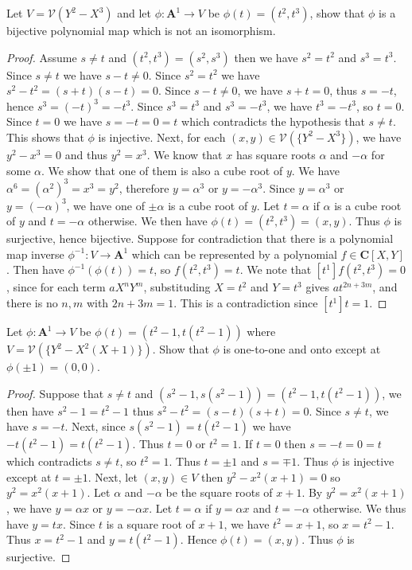 \documentclass[11pt]{book}
\begin{document}
\begin{problem}
Let $V=\mathcal{V}(Y^2-X^3)$ and let $\phi:\mathbf{A}^1\rightarrow V$ be $\phi(t)=(t^2,t^3)$, show that $\phi$ is a bijective polynomial map which is not an isomorphism.
\begin{proof}
Assume $s\ne t$ and $(t^2,t^3)=(s^2,s^3)$ then we have $s^2=t^2$ and $s^3=t^3$. Since $s\ne t$ we have $s-t\ne 0$. Since $s^2=t^2$ we have $s^2-t^2=(s+t)(s-t)=0$. Since $s-t\ne 0$, we have $s+t=0$, thus $s=-t$, hence $s^3=(-t)^3=-t^3$. Since $s^3=t^3$ and $s^3=-t^3$, we have $t^3=-t^3$, so $t=0$. Since $t=0$ we have $s=-t=0=t$ which contradicts the hypothesis that $s\ne t$. This shows that $\phi$ is injective. 
Next, for each $(x,y)\in\mathcal{V}(\{Y^2-X^3\})$, we have $y^2-x^3=0$ and thus $y^2=x^3$. We know that $x$ has square roots $\alpha$ and $-\alpha$ for some $\alpha$. We show that one of them is also a cube root of $y$. We have $\alpha^6=(\alpha^2)^3=x^3=y^2$, therefore $y=\alpha^3$ or $y=-\alpha^3$. Since $y=\alpha^3$ or $y=(-\alpha)^3$, we have one of $\pm\alpha$ is a cube root of $y$. Let $t=\alpha$ if $\alpha$ is a cube root of $y$ and $t=-\alpha$ otherwise. We then have $\phi(t)=(t^2,t^3)=(x,y)$. Thus $\phi$ is surjective, hence bijective. Suppose for contradiction that there is a polynomial map inverse $\phi^{-1}:V\rightarrow\mathbf A^1$ which can be represented by a polynomial $f\in\mathbf C[X,Y]$. Then have $\phi^{-1}(\phi(t))=t$, so $f(t^2,t^3)=t$. We note that $[t^1]f(t^2,t^3)=0$, since for each term $aX^nY^m$, substituding $X=t^2$ and $Y=t^3$ gives $at^{2n+3m}$, and there is no $n,m$ with $2n+3m=1$. This is a contradiction since $[t^1]t=1$.
\end{proof}
\end{problem}
\begin{problem}
Let $\phi:\mathbf A^1\rightarrow V$ be $\phi(t)=(t^2-1,t(t^2-1))$ where $V=\mathcal{V}(\{Y^2-X^2(X+1)\})$. Show that $\phi$ is one-to-one and onto except at $\phi(\pm 1)=(0,0)$.
\begin{proof}Suppose that $s\ne t$ and $(s^2-1,s(s^2-1))=(t^2-1,t(t^2-1))$, we then have $s^2-1=t^2-1$ thus $s^2-t^2=(s-t)(s+t)=0$. Since $s\ne t$, we have $s=-t$. Next, since $s(s^2-1)=t(t^2-1)$ we have $-t(t^2-1)=t(t^2-1)$. Thus $t=0$ or $t^2=1$. If $t=0$ then $s=-t=0=t$ which contradicts $s\ne t$, so $t^2=1$. Thus $t=\pm 1$ and $s=\mp 1$. Thus $\phi$ is injective except at $t=\pm 1$. Next, let $(x,y)\in V$ then $y^2-x^2(x+1)=0$ so $y^2=x^2(x+1)$. Let $\alpha$ and $-\alpha$ be the square roots of $x+1$. By $y^2=x^2(x+1)$, we have $y=\alpha x$ or $y=-\alpha x$. Let $t=\alpha$ if $y=\alpha x$ and $t=-\alpha$ otherwise. We thus have $y=tx$. Since $t$ is a square root of $x+1$, we have $t^2=x+1$, so $x=t^2-1$. Thus $x=t^2-1$ and $y=t(t^2-1)$. Hence $\phi(t)=(x,y)$. Thus $\phi$ is surjective.
\end{proof}
\end{problem}
\end{document}
